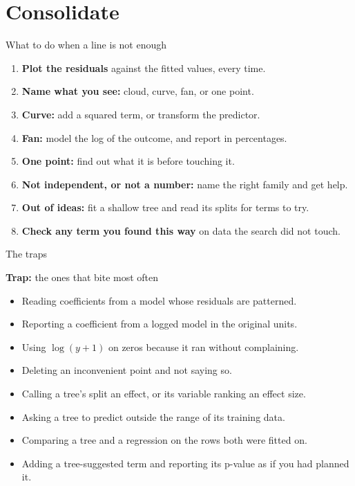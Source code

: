 \documentclass[aspectratio=169]{beamer}
\newenvironment{trap}[1]{\begin{alertblock}{\textbf{Trap:} #1}}{\end{alertblock}}
\begin{document}
\section{Consolidate}
\begin{frame}{What to do when a line is not enough}
\small
\begin{enumerate}
  \item \textbf{Plot the residuals} against the fitted values, every time.
  \item \textbf{Name what you see:} cloud, curve, fan, or one point.
  \item \textbf{Curve:} add a squared term, or transform the predictor.
  \item \textbf{Fan:} model the log of the outcome, and report in percentages.
  \item \textbf{One point:} find out what it is before touching it.
  \item \textbf{Not independent, or not a number:} name the right family and get help.
  \item \textbf{Out of ideas:} fit a shallow tree and read its splits for terms to try.
  \item \textbf{Check any term you found this way} on data the search did not touch.
\end{enumerate}
\end{frame}

\begin{frame}{The traps}
\begin{trap}{the ones that bite most often}
\begin{itemize}
  \item Reading coefficients from a model whose residuals are patterned.
  \item Reporting a coefficient from a logged model in the original units.
  \item Using $\log(y+1)$ on zeros because it ran without complaining.
  \item Deleting an inconvenient point and not saying so.
  \item Calling a tree's split an effect, or its variable ranking an effect size.
  \item Asking a tree to predict outside the range of its training data.
  \item Comparing a tree and a regression on the rows both were fitted on.
  \item Adding a tree-suggested term and reporting its p-value as if you had planned it.
\end{itemize}
\end{trap}
\end{frame}
\end{document}
